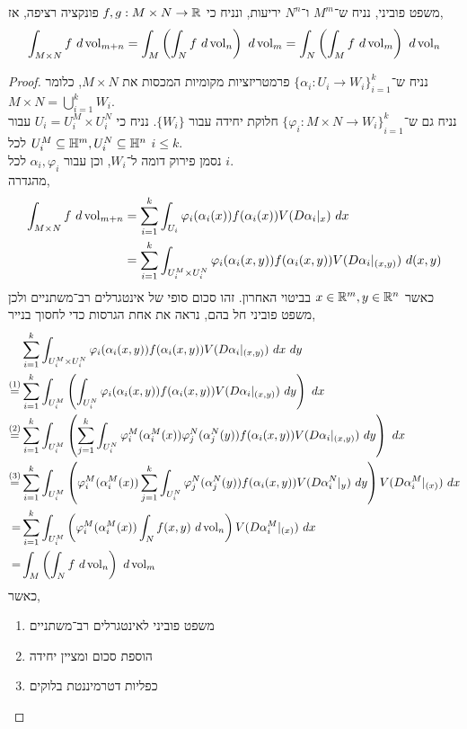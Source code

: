 \subquestion{}
משפט פוביני,
נניח ש־$M^m$ ו־$N^n$ יריעות, ונניח כי $f, g : M \times N \to \mathbb{R}$ פונקציה רציפה,
אז,
\[
	\int_{M \times N} f\ d\operatorname{vol}_{m + n}
	= \int_{M} \left( \int_N f\ d\operatorname{vol}_n \right)\ d\operatorname{vol}_m
	= \int_{N} \left( \int_M f\ d\operatorname{vol}_m \right)\ d\operatorname{vol}_n
\]
\begin{proof}
	נניח ש־${\{ \alpha_i : U_i \to W_i \}}_{i = 1}^k$ פרמטריזציות מקומיות המכסות את $M \times N$, כלומר $M \times N = \bigcup_{i = 1}^k W_i$. \\
	נניח גם ש־${\{ \varphi_i : M \times N \to W_i \}}_{i = 1}^k$ חלוקת יחידה עבור $\{ W_i \}$.
	נניח כי $U_i = U_i^M \times U_i^N$ עבור $U_i^M \subseteq \mathbb{H}^m, U_i^N \subseteq \mathbb{H}^n$ לכל $i \le k$. \\
	נסמן פירוק דומה ל־$W_i$, וכן עבור $\alpha_i, \varphi_i$ לכל $i$. \\
	מהגדרה,
	\begin{align*}
		\int_{M \times N} f\ d\vol_{m + n}
		& = \sum_{i = 1}^k \int_{U_i} \varphi_i(\alpha_i(x)) f(\alpha_i(x)) V(D \alpha_i |_x)\ dx \\
		& = \sum_{i = 1}^k \int_{U_i^M \times U_i^N} \varphi_i(\alpha_i(x, y)) f(\alpha_i(x, y)) V(D \alpha_i |_{(x, y)})\ d(x, y)
	\end{align*}
	כאשר $x \in \mathbb{R}^m, y \in \mathbb{R}^n$ בביטוי האחרון.
	זהו סכום סופי של אינטגרלים רב־משתניים ולכן משפט פוביני חל בהם, נראה את אחת הגרסות כדי לחסוך בנייר,
	\begin{align*}
		& \sum_{i = 1}^k \int_{U_i^M \times U_i^N} \varphi_i(\alpha_i(x, y)) f(\alpha_i(x, y)) V(D \alpha_i |_{(x, y)})\ dx\ dy \\
		\overset{(1)}{=}  & \sum_{i = 1}^k \int_{U_i^M} \left( \int_{U_i^N} \varphi_i(\alpha_i(x, y)) f(\alpha_i(x, y)) V(D \alpha_i |_{(x, y)})\ dy \right)\ dx \\
		\overset{(2)}{=}  & \sum_{i = 1}^k \int_{U_i^M} \left( \sum_{j = 1}^k \int_{U_i^N} \varphi_i^M(\alpha_i^M(x)) \varphi_j^N(\alpha_j^N(y)) f(\alpha_i(x, y)) V(D \alpha_i |_{(x, y)})\ dy \right)\ dx \\
		\overset{(3)}{=}  & \sum_{i = 1}^k \int_{U_i^M} \left( \varphi_i^M(\alpha_i^M(x)) \sum_{j = 1}^k \int_{U_i^N} \varphi_j^N(\alpha_j^N(y)) f(\alpha_i(x, y)) V(D \alpha_i^N |_{y})\ dy \right)V(D \alpha_i^M |_{(x)})\ dx \\
		= & \sum_{i = 1}^k \int_{U_i^M} \left( \varphi_i^M(\alpha_i^M(x)) \int_{N} f(x, y)\ d\vol_n \right) V(D \alpha_i^M |_{(x)})\ dx \\
		= & \int_{M} \left( \int_{N} f\ d\vol_n \right)\ d\vol_m
	\end{align*}
	כאשר,
	\begin{enumerate}
		\item משפט פוביני לאינטגרלים רב־משתניים
		\item הוספת סכום ומציין יחידה
		\item כפליות דטרמיננטת בלוקים
	\end{enumerate}
\end{proof}

